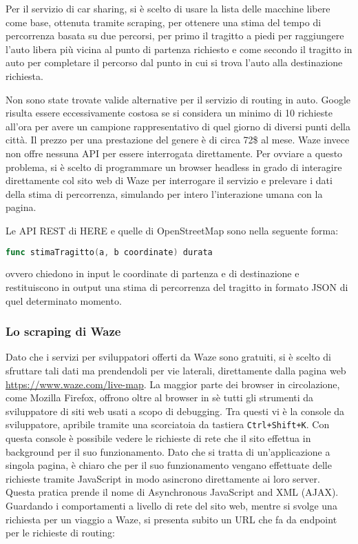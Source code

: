 Per il servizio di car sharing, si è scelto di usare la lista delle macchine libere come base, ottenuta tramite scraping, per ottenere una stima del tempo di percorrenza basata su due percorsi, per primo il tragitto a piedi per raggiungere l'auto libera più vicina al punto di partenza richiesto e come secondo il tragitto in auto per completare il percorso dal punto in cui si trova l'auto alla destinazione richiesta.

Non sono state trovate valide alternative per il servizio di routing in auto. Google risulta essere eccessivamente costosa se si considera un minimo di 10 richieste all'ora per avere un campione rappresentativo di quel giorno di diversi punti della città. Il prezzo per una prestazione del genere è di circa 72\$ al mese. Waze invece non offre nessuna API per essere interrogata direttamente. Per ovviare a questo problema, si è scelto di programmare un browser headless in grado di interagire direttamente col sito web di Waze per interrogare il servizio e prelevare i dati della stima di percorrenza, simulando per intero l'interazione umana con la pagina.

Le API REST di HERE e quelle di OpenStreetMap sono nella seguente forma:
\begin{lstlisting}[language=Go]
func stimaTragitto(a, b coordinate) durata
\end{lstlisting}
ovvero chiedono in input le coordinate di partenza e di destinazione e restituiscono in output una stima di percorrenza del tragitto in formato JSON di quel determinato momento.

\subsubsection{Lo scraping di Waze}

Dato che i servizi per sviluppatori offerti da Waze sono gratuiti, si è scelto di sfruttare tali dati ma prendendoli per vie laterali, direttamente dalla pagina web \url{https://www.waze.com/live-map}. La maggior parte dei browser in circolazione, come Mozilla Firefox, offrono oltre al browser in sè tutti gli strumenti da sviluppatore di siti web usati a scopo di debugging. Tra questi vi è la console da sviluppatore, apribile tramite una scorciatoia da tastiera \texttt{Ctrl+Shift+K}. Con questa console è possibile vedere le richieste di rete che il sito effettua in background per il suo funzionamento. Dato che si tratta di un'applicazione a singola pagina, è chiaro che per il suo funzionamento vengano effettuate delle richieste tramite JavaScript in modo asincrono direttamente ai loro server. Questa pratica prende il nome di Asynchronous JavaScript and XML (AJAX)\cite{ajaxwiki}. Guardando i comportamenti a livello di rete del sito web, mentre si svolge una richiesta per un viaggio a Waze, si presenta subito un URL che fa da endpoint per le richieste di routing:


